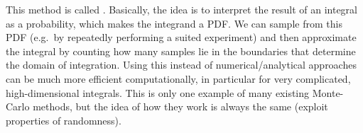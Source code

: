 This method is called . Basically, the idea is to interpret the result of an integral as a probability, which makes the integrand a PDF. We can sample from this PDF (e.g.~by repeatedly performing a suited experiment) and then approximate the integral by counting how many samples lie in the boundaries that determine the domain of integration. Using this instead of numerical/analytical approaches can be much more efficient computationally, in particular for very complicated, high-dimensional integrals. This is only one example of many existing Monte-Carlo methods, but the idea of how they work is always the same (exploit properties of randomness).





